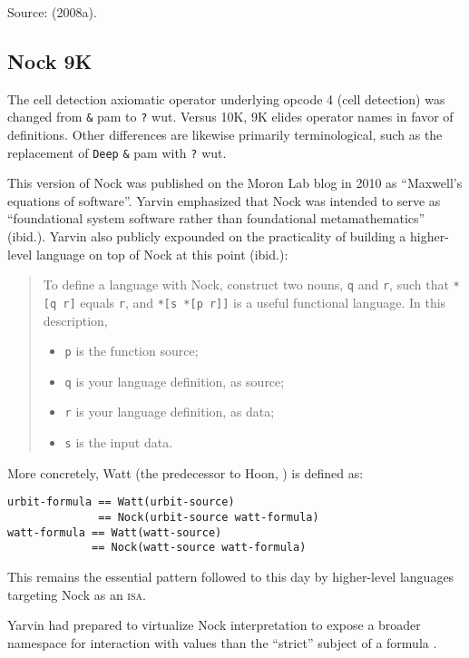 \documentclass[twoside]{article}
\begin{document}
Source:   (2008a). %

\subsection{Nock 9K}

The cell detection axiomatic operator underlying opcode 4 (cell detection) was changed from \texttt{\&} pam to \texttt{?} wut.  Versus 10K, 9K elides operator names in favor of definitions.  Other differences are likewise primarily terminological, such as the replacement of \texttt{Deep} \texttt{\&} pam with \texttt{?} wut.

This version of Nock was published on the Moron Lab blog in 2010 \citep{Yarvin2010c} as ``Maxwell's equations of software''.  Yarvin emphasized that Nock was intended to serve as ``foundational system software rather than foundational metamathematics'' (ibid.).  Yarvin also publicly expounded on the practicality of building a higher-level language on top of Nock at this point (ibid.):

\begin{quote}
To define a language with Nock, construct two nouns, \texttt{q} and \texttt{r}, such that \texttt{*[q r]} equals \texttt{r}, and \texttt{*[s *[p r]]} is a useful functional language. In this description,
\begin{itemize}
  \item  \texttt{p} is the function source;
  \item  \texttt{q} is your language definition, as source;
  \item  \texttt{r} is your language definition, as data;
  \item  \texttt{s} is the input data.
\end{itemize}
\end{quote}

\noindent
More concretely, Watt (the predecessor to Hoon, \citet{Yarvin2010a}) is defined as:

\begin{lstlisting}[style=listingcode]
urbit-formula == Watt(urbit-source)
              == Nock(urbit-source watt-formula)
watt-formula == Watt(watt-source)
             == Nock(watt-source watt-formula)
\end{lstlisting}

\noindent
This remains the essential pattern followed to this day by higher-level languages targeting Nock as an \textsc{isa}.

Yarvin had prepared to virtualize Nock interpretation to expose a broader namespace for interaction with values than the ``strict'' subject of a formula \citep{Yarvin2010c}.
\end{document}
